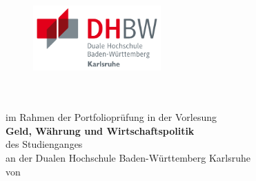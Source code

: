 \thispagestyle{empty}
\begin{titlepage}
\enlargethispage{4cm}

\begin{figure}           %
	\begin{minipage}{0.49\textwidth}
		\flushleft
	\end{minipage}
	\hfill
	\begin{minipage}{0.49\textwidth}
		\flushright
		\includegraphics[height=2.5cm]{Bilder/Logos/Logo_DHBW.pdf} 
	\end{minipage}
\end{figure} 
\vspace*{2.5cm}

\begin{center}
	\huge{\textbf{\titel}}\\[1.5cm]
	\Large{\textbf{\arbeit}}\\[0.5cm]
	\normalsize{im Rahmen der Portfolioprüfung in der Vorlesung\\[1ex] \textbf{Geld, Währung und Wirtschaftspolitik}}\\[0.5cm]
	\Large{des Studienganges \studiengang}\\[1ex]
	\normalsize{an der Dualen Hochschule Baden-Württemberg Karlsruhe}\\[1cm]
	\normalsize{von}\\[1ex] \Large{\textbf{\autor}} \\[1cm]




\end{center}


\end{titlepage}
